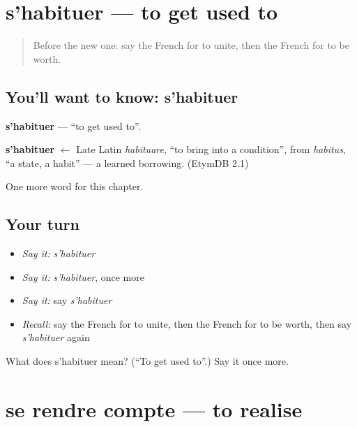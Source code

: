 \section[s'habituer]{s'habituer — to get used to}

\label{lesson:FR-C239-habituer}



\begin{quote}
Before the new one: say the French for to unite, then the French for to be worth.
\end{quote}

\subsection*{You'll want to know: s'habituer}
\textbf{s'habituer} — \textquotedblleft{}to get used to\textquotedblright{}.

\begin{cousinweb}
\textbf{s'habituer} $\leftarrow$ Late Latin \emph{habituare}, \textquotedblleft{}to bring into a condition\textquotedblright{}, from \emph{habitus}, \textquotedblleft{}a state, a habit\textquotedblright{} — a learned borrowing. (EtymDB 2.1)
\end{cousinweb}

\begin{grammarlens}[title={What you've built}]
One more word for this chapter.
\end{grammarlens}

\subsection*{Your turn}
\begin{itemize}
\raggedright
  \item \emph{Say it:} \emph{s'habituer}
  \item \emph{Say it:} \emph{s'habituer}, once more
  \item \emph{Say it:} say \emph{s'habituer}
  \item \emph{Recall:} say the French for to unite, then the French for to be worth, then say \emph{s'habituer} again
\end{itemize}

\begin{tcolorbox}[breakable,colback=teal!4,colframe=teal!35!black,title={Before you move on}]
What does s'habituer mean? (\textquotedblleft{}To get used to\textquotedblright{}.) Say it once more.
\end{tcolorbox}
\section[se rendre compte]{se rendre compte — to realise}

